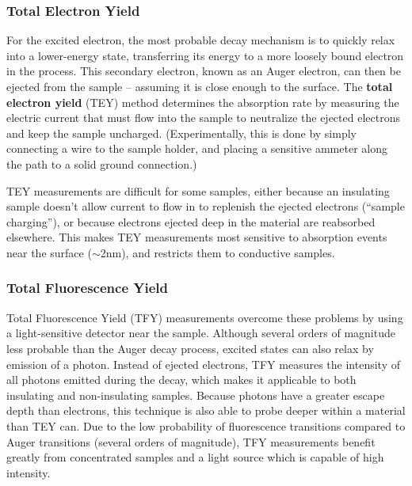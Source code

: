 \subsubsection{Total Electron Yield}
For the excited electron, the most probable decay mechanism is to quickly relax into a lower-energy state, transferring its energy to a more loosely bound electron in the process.  This secondary electron, known as an Auger electron, can then be ejected from the sample -- assuming it is close enough to the surface.  The \textbf{total electron yield} (TEY) method determines the absorption rate by measuring the electric current that must flow into the sample to neutralize the ejected electrons and keep the sample uncharged.  (Experimentally, this is done by simply connecting a wire to the sample holder, and placing a sensitive ammeter along the path to a solid ground connection.)

TEY measurements are difficult for some samples, either because an insulating sample doesn't allow current to flow in to replenish the ejected electrons (``sample charging''), or because electrons ejected deep in the material are reabsorbed elsewhere.  This makes TEY measurements most sensitive to absorption events near the surface ($\sim$2nm), and restricts them to conductive samples.
\subsubsection{Total Fluorescence Yield}
Total Fluorescence Yield (TFY) measurements overcome these problems by using a light-sensitive detector near the sample.  Although several orders of magnitude less probable than the Auger decay process, excited states can also relax by emission of a photon.  Instead of ejected electrons, TFY measures the intensity of all photons emitted during the decay, which makes it applicable to both insulating and non-insulating samples.  Because photons have a greater escape depth than electrons, this technique is also able to probe deeper within a material than TEY can.  Due to the low probability of fluorescence transitions compared to Auger transitions (several orders of magnitude), TFY measurements benefit greatly from concentrated samples and a light source which is capable of high intensity.

